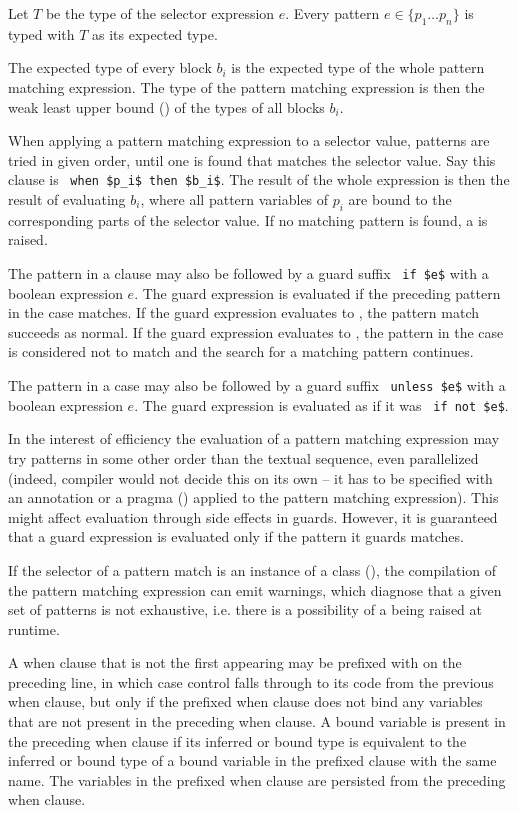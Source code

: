 Let $T$ be the type of the selector expression $e$. Every pattern $e \in \{ p_1 \ldots p_n \}$ is typed with $T$ as its expected type. 

The expected type of every block $b_i$ is the expected type of the whole pattern matching expression. The type of the pattern matching expression is then the weak least upper bound () of the types of all blocks $b_i$. 

When applying a pattern matching expression to a selector value, patterns are tried in given order, until one is found that matches the selector value. Say this  clause is ~\lstinline!when $p_i$ then $b_i$!. The result of the whole expression is then the result of evaluating $b_i$, where all pattern variables of $p_i$ are bound to the corresponding parts of the selector value. If no matching pattern is found, a  is raised. 

The pattern in a  clause may also be followed by a guard suffix ~\lstinline!if $e$! with a boolean expression $e$. The guard expression is evaluated if the preceding pattern in the case matches. If the guard expression evaluates to , the pattern match succeeds as normal. If the guard expression evaluates to , the pattern in the case is considered not to match and the search for a matching pattern continues. 

The pattern in a case may also be followed by a guard suffix ~\lstinline!unless $e$! with a boolean expression $e$. The guard expression is evaluated as if it was ~\lstinline!if not $e$!. 

In the interest of efficiency the evaluation of a pattern matching expression may try patterns in some other order than the textual sequence, even parallelized (indeed, compiler would not decide this on its own -- it has to be specified with an annotation or a pragma () applied to the pattern matching expression). This might affect evaluation through side effects in guards. However, it is guaranteed that a guard expression is evaluated only if the pattern it guards matches.

If the selector of a pattern match is an instance of a  class (), the compilation of the pattern matching expression can emit warnings, which diagnose that a given set of patterns is not exhaustive, i.e. there is a possibility of a  being raised at runtime. 

A when clause that is not the first appearing may be prefixed with  on the preceding line, in which case control falls through to its code from the previous when clause, but only if the prefixed when clause does not bind any variables that are not present in the preceding when clause. A bound variable is present in the preceding when clause if its inferred or bound type is equivalent to the inferred or bound type of a bound variable in the prefixed clause with the same name. The variables in the prefixed when clause are persisted from the preceding when clause. 






